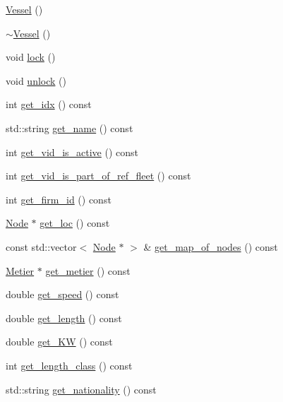 \begin{DoxyCompactItemize}
\item 
\mbox{\hyperlink{class_vessel_a31aa5296ad9d5975a5624f316085d165}{Vessel}} ()
\item 
\mbox{\hyperlink{class_vessel_a307b24669d894fc8834ff4166f277cd8}{$\sim$\+Vessel}} ()
\item 
void \mbox{\hyperlink{class_vessel_aa565776bbb7a278f4e622ea938819434}{lock}} ()
\item 
void \mbox{\hyperlink{class_vessel_a11b06c31d054a5330b5b32350789fbd1}{unlock}} ()
\item 
int \mbox{\hyperlink{class_vessel_a7c9871ffbb09b11564520a2ed682e3df}{get\+\_\+idx}} () const
\item 
std\+::string \mbox{\hyperlink{class_vessel_a5a5c3091358b64ca136b3223fbf4364d}{get\+\_\+name}} () const
\item 
int \mbox{\hyperlink{class_vessel_a39807ec16657abda9baf63ef17d4a974}{get\+\_\+vid\+\_\+is\+\_\+active}} () const
\item 
int \mbox{\hyperlink{class_vessel_ac47e37e065bacfbbf1247689ddb6eda9}{get\+\_\+vid\+\_\+is\+\_\+part\+\_\+of\+\_\+ref\+\_\+fleet}} () const
\item 
int \mbox{\hyperlink{class_vessel_adb8e199cb64c9b0fd5d936cfe118aecf}{get\+\_\+firm\+\_\+id}} () const
\item 
\mbox{\hyperlink{class_node}{Node}} $\ast$ \mbox{\hyperlink{class_vessel_a82ae3f030aaf6d3f7a3a8142e1bbf636}{get\+\_\+loc}} () const
\item 
const std\+::vector$<$ \mbox{\hyperlink{class_node}{Node}} $\ast$ $>$ \& \mbox{\hyperlink{class_vessel_afbeb90c02d251a95e043b9640a008da1}{get\+\_\+map\+\_\+of\+\_\+nodes}} () const
\item 
\mbox{\hyperlink{class_metier}{Metier}} $\ast$ \mbox{\hyperlink{class_vessel_a15e60448661e06cfbd6c5809fbc8e121}{get\+\_\+metier}} () const
\item 
double \mbox{\hyperlink{class_vessel_a9a1749304d3d357563785cc4094d261a}{get\+\_\+speed}} () const
\item 
double \mbox{\hyperlink{class_vessel_a069a144cd5dd8a8265e66df212c51eef}{get\+\_\+length}} () const
\item 
double \mbox{\hyperlink{class_vessel_a3c263e48de680fec1a97d5a529deded0}{get\+\_\+\+KW}} () const
\item 
int \mbox{\hyperlink{class_vessel_a859fc73647ce8d1f5ee7869423dbf9d0}{get\+\_\+length\+\_\+class}} () const
\item 
std\+::string \mbox{\hyperlink{class_vessel_ac28c8be120c62bd02c69967c8b6f9eda}{get\+\_\+nationality}} () const

\end{DoxyCompactItemize}
